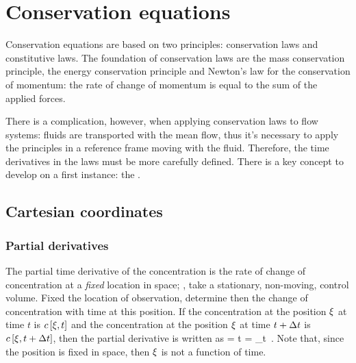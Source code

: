 \section{Conservation equations}
Conservation equations are based on two principles: conservation laws and constitutive laws. The foundation of conservation laws are the mass conservation principle, the energy conservation principle and Newton's law for the conservation of momentum: the rate of change of momentum is equal to the sum of the applied forces.

There is a complication, however, when applying conservation laws to flow systems: fluids are transported with the mean flow, thus it's necessary to apply the principles in a reference frame moving with the fluid. Therefore, the time derivatives in the laws must be more carefully defined. There is a key concept to develop on a first instance: the .


\subsection{Cartesian coordinates}

\subsubsection{Partial derivatives}
The partial time derivative of the concentration is the rate of change of concentration at a \emph{fixed} location in space; \ie, take a stationary, non-moving, control volume. Fixed the location of observation, determine then the change of concentration with time at this position. If the concentration at the position $\xi$ at time $t$ is $c\left[{\xi, t}\right]$ and the concentration at the position $\xi$ at time $t + \Delta t$ is $c\left[{\xi, t + \Delta t}\right]$, then the partial derivative is written as
\beq
{} = \ipd t\conc 
               = \lim_{\Dx t} \,.
\eeq
Note that, since the position is fixed in space, then $\xi$ is not a function of time.


